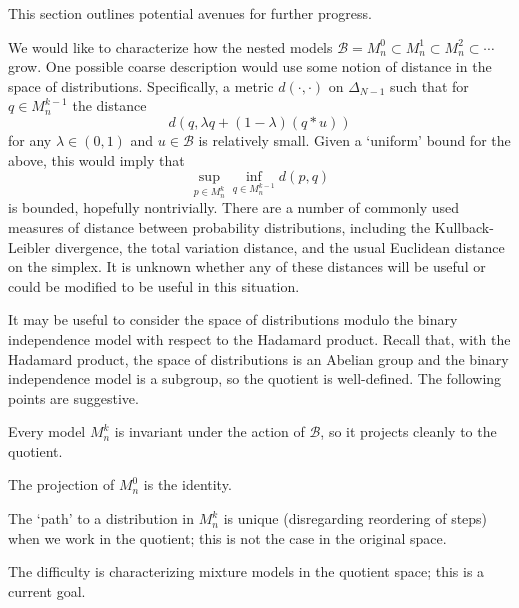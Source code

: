 \documentclass[11pt,titlepage]{article}
\newcommand*{\Bin}{\mathcal{B}}
\numberwithin{equation}{section}
\begin{document}
    This section outlines potential avenues for further progress.

    We would like to characterize how the nested models $\Bin = M_n^0 \subset
    M_n^1 \subset M_n^2 \subset \cdots$ grow.  One possible coarse description
    would use some notion of distance in the space of distributions.
    Specifically, a metric $d(\cdot, \cdot)$ on $\Delta_{N-1}$ such that for $q
    \in M_n^{k-1}$ the distance
    \[
        d(q, \lambda q + (1 - \lambda)(q * u))
    \]
    for any $\lambda \in (0,1)$ and $u \in \Bin$ is relatively small.  Given a
    `uniform' bound for the above, this would imply that
    \[
        \sup_{p \in M_n^k}
        \inf_{q \in M_n^{k-1}} d(p, q)
    \]
    is bounded, hopefully nontrivially.  There are a number of commonly used
    measures of distance between probability distributions, including the
    Kullback-Leibler divergence, the total variation distance, and the usual
    Euclidean distance on the simplex.  It is unknown whether any of these
    distances will be useful or could be modified to be useful in this
    situation.

    It may be useful to consider the space of distributions modulo the binary
    independence model with respect to the Hadamard product.  Recall that, with
    the Hadamard product, the space of distributions is an Abelian group and the
    binary independence model is a subgroup, so the quotient is well-defined.
    The following points are suggestive.
    \begin{itemize*}
        \item Every model $M_n^k$ is invariant under the action of $\Bin$, so
        it projects cleanly to the quotient.
        \item The projection of $M_n^0$ is the identity.
        \item The `path' to a distribution in $M_n^k$ is unique (disregarding
        reordering of steps) when we work in the quotient; this is not the case
        in the original space.
    \end{itemize*}
    The difficulty is characterizing mixture models in the quotient space; this
    is a current goal.
    

\end{document}

